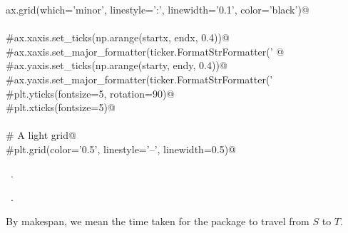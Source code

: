 \documentclass[10.0pt]{report}
\begin{document}
\begin{flushleft}
\begin{list}{}{}
\mbox{}\verb@    ax.grid(which='minor', linestyle=':', linewidth='0.1', color='black')@\\
\mbox{}\verb@@\\
\mbox{}\verb@    #ax.xaxis.set_ticks(np.arange(startx, endx, 0.4))@\\
\mbox{}\verb@    #ax.xaxis.set_major_formatter(ticker.FormatStrFormatter('%0.1f'))@\\
\mbox{}\verb@     @\\
\mbox{}\verb@    #ax.yaxis.set_ticks(np.arange(starty, endy, 0.4))@\\
\mbox{}\verb@    #ax.yaxis.set_major_formatter(ticker.FormatStrFormatter('%0.1f'))@\\
\mbox{}\verb@@\\
\mbox{}\verb@    #plt.yticks(fontsize=5, rotation=90)@\\
\mbox{}\verb@    #plt.xticks(fontsize=5)@\\
\mbox{}\verb@@\\
\mbox{}\verb@    # A light grid@\\
\mbox{}\verb@    #plt.grid(color='0.5', linestyle='--', linewidth=0.5)@\\
\mbox{}\verb@@{\NWsep}
\end{list}
\vspace{-1.5ex}
\footnotesize
\begin{list}{}{\setlength{\itemsep}{-\parsep}\setlength{\itemindent}{-\leftmargin}}
\item \NWtxtMacroDefBy\ .
\item \NWtxtMacroRefIn\ .

\item{}
\end{list}
\vspace{4ex}
\end{flushleft}


By makespan, we mean the time taken for the package to travel from $S$ to $T$.
\end{document}
